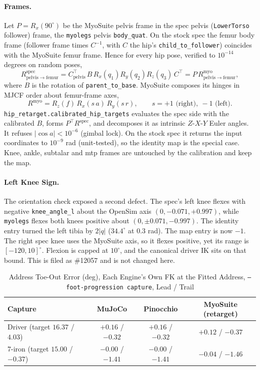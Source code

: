 \documentclass[11pt]{article}
\begin{document}
\paragraph{Frames.} Let $P = R_x(90^\circ)$ be the MyoSuite pelvis frame in
the spec pelvis (\texttt{LowerTorso} follower) frame, the \texttt{myolegs}
pelvis \texttt{body\_quat}. On the stock spec the femur body frame (follower
frame times $C^{-1}$, with $C$ the hip's \texttt{child\_to\_follower})
coincides with the MyoSuite femur frame. Hence for every hip pose,
verified to $10^{-14}$ degrees on random poses,
\begin{equation}
  R^{\mathrm{spec}}_{\mathrm{pelvis}\to\mathrm{femur}}
  = C_{\mathrm{pelvis}}^{\top}\, B\, R_x(q_1) R_y(q_2) R_z(q_3)\, C^{\top}
  = P\, R^{\mathrm{myo}}_{\mathrm{pelvis}\to\mathrm{femur}},
\end{equation}
where $B$ is the rotation of \texttt{parent\_to\_base}. MyoSuite composes
its hinges in MJCF order about femur-frame axes,
\begin{equation}
  R^{\mathrm{myo}} = R_z(f)\, R_x(s\,a)\, R_y(s\,r), \qquad
  s = +1 \text{ (right)},\ -1 \text{ (left)}.
\end{equation}
\texttt{hip\_retarget.calibrated\_hip\_targets} evaluates the spec side with
the calibrated $B$, forms $P^{\top} R^{\mathrm{spec}}$, and decomposes it as
intrinsic $Z$-$X$-$Y$ Euler angles. It refuses $|\cos a| < 10^{-6}$ (gimbal
lock). On the stock spec it returns the input coordinates to $10^{-9}$ rad
(unit-tested), so the identity map is the special case. Knee, ankle,
subtalar and mtp frames are untouched by the calibration and keep the map.

\paragraph{Left Knee Sign.} The orientation check exposed a second defect.
The spec's left knee flexes with negative \texttt{knee\_angle\_l} about the
OpenSim axis $(0, -0.071, +0.997)$, while \texttt{myolegs} flexes both knees
positive about $(0, \pm0.071, -0.997)$. The identity entry turned the left
tibia by $2|q|$ ($34.4^\circ$ at $0.3$ rad). The map entry is now $-1$. The
right spec knee uses the MyoSuite axis, so it flexes positive, yet its
range is $[-120, 10]^\circ$. Flexion is capped at $10^\circ$, and the canonical
driver IK sits on that bound. This is filed as \#12057 and is not changed
here.

\begin{table}[h]
\centering
\caption{Address Toe-Out Error (deg), Each Engine's Own FK at the Fitted
Address, \texttt{--foot-progression capture}, Lead / Trail}
\label{tab:myo}
\begin{tabular}{lccc}
\toprule
Capture & MuJoCo & Pinocchio & MyoSuite (retarget) \\
\midrule
Driver (target $16.37$ / $4.03$) & $+0.16$ / $-0.32$ & $+0.16$ / $-0.32$ & $+0.12$ / $-0.37$ \\
7-iron (target $15.00$ / $-0.37$) & $-0.00$ / $-1.41$ & $-0.00$ / $-1.41$ & $-0.04$ / $-1.46$ \\
\bottomrule
\end{tabular}
\end{table}
\end{document}
